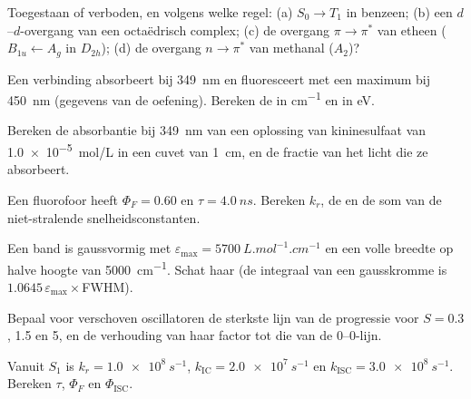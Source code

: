 \begin{exercise}[$\star$]\label{exo:b3:electronic-spectroscopy:1}
Toegestaan of verboden, en volgens welke regel: (a) $S_0 \to T_1$ in benzeen; (b) een $d$--$d$-overgang
van een octaëdrisch complex; (c) de overgang $\pi\to\pi^*$ van etheen
($B_{1u} \leftarrow A_g$ in $D_{2h}$); (d) de overgang $n\to\pi^*$ van methanal
($A_2$)?
\end{exercise}

\begin{exercise}[$\star$]\label{exo:b3:electronic-spectroscopy:2}
Een verbinding absorbeert bij \qty{349}{nm} en fluoresceert met een maximum bij
\qty{450}{nm} (gegevens van de oefening). Bereken de  in
\unit{cm^{-1}} en in
eV.
\end{exercise}

\begin{exercise}[$\star$]\label{exo:b3:electronic-spectroscopy:3}
Bereken de absorbantie bij \qty{349}{nm} van een oplossing van kininesulfaat van
\qty{1.0e-5}{mol/L} in een cuvet van \qty{1}{cm}, en de fractie van het
licht die ze absorbeert.
\end{exercise}

\begin{exercise}[$\star$]\label{exo:b3:electronic-spectroscopy:4}
Een fluorofoor heeft $\Phi_F = 0.60$ en $\tau = \qty{4.0}{ns}$. Bereken $k_r$, de
 en de som van de niet-stralende snelheidsconstanten.
\end{exercise}

\begin{exercise}[$\star\star$]\label{exo:b3:electronic-spectroscopy:5}
Een band is gaussvormig met $\varepsilon_{\max} = \qty{5700}{L.mol^{-1}.cm^{-1}}$ en een
volle breedte op halve hoogte van \qty{5000}{cm^{-1}}. Schat haar
 (de integraal van een gausskromme is
$1.0645\,\varepsilon_{\max}\times$FWHM).
\end{exercise}

\begin{exercise}[$\star\star$]\label{exo:b3:electronic-spectroscopy:6}
Bepaal voor verschoven oscillatoren de sterkste lijn van de progressie
voor $S = 0.3$, 1.5 en 5, en de verhouding van haar factor tot die van de
0--0-lijn.
\end{exercise}

\begin{exercise}[$\star\star$]\label{exo:b3:electronic-spectroscopy:7}
Vanuit $S_1$ is $k_r = \qty{1.0e8}{s^{-1}}$, $k_{\mathrm{IC}} = \qty{2.0e7}{s^{-1}}$ en $k_{\mathrm{ISC}} =
\qty{3.0e8}{s^{-1}}$. Bereken $\tau$, $\Phi_F$ en $\Phi_{\mathrm{ISC}}$.
\end{exercise}

